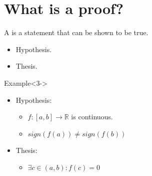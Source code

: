 \documentclass[11pt,a4paper,xcolor=dvipsnames, leqno]{beamer}
\begin{document}
\section{What is a proof?}
\begin{frame}
A  is a statement that can be shown to be true.
\begin{itemize}
\item <2->Hypothesis.
\item <2->Thesis.
\end{itemize}
\begin{block}{Example}<3->
\begin{itemize}
\item<4-> Hypothesis:
\begin{itemize}
\item<5-> $f:[a, b]\rightarrow \mathbb{R}$ is continuous.
\item<5-> $sign(f(a)) \neq sign(f(b))$
\end{itemize}
\item<4-> Thesis:\\
\begin{itemize}
\item<6-> $\exists c\in (a, b): f(c) = 0$
\end{itemize}
\end{itemize}
\end{block}
\end{frame}
\end{document}
